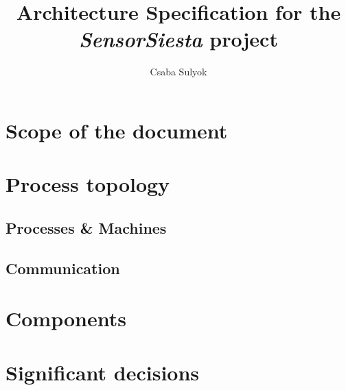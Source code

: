 \documentclass[12pt,a4paper]{article}
\title{Architecture Specification for the \emph{SensorSiesta} project}
\author{Csaba Sulyok}
\begin{document}
\maketitle

\section{Scope of the document}

\section{Process topology}

\subsection{Processes \& Machines}

\subsection{Communication}

\section{Components}

\section{Significant decisions}
\end{document}

